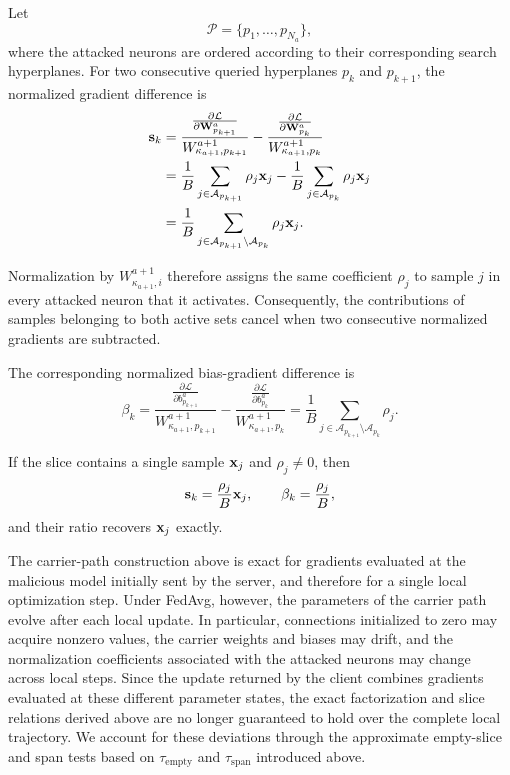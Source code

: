 Let
\[
    \mathcal P=\{p_1,\ldots,p_{N_a}\},
\]
where the attacked neurons are ordered according to their corresponding
search hyperplanes. For two consecutive queried hyperplanes $p_k$ and
$p_{k+1}$, the normalized gradient difference is
\begin{equation}\label{eq:stealth_slice}
\begin{aligned}
\mathbf{s}_k
&=
\frac{
    \frac{\partial\mathcal L}
         {\partial\mathbf{W}_{p_{k+1}}^a}
}{
    W^{a+1}_{\kappa_{a+1},p_{k+1}}
}
-
\frac{
    \frac{\partial\mathcal L}
         {\partial\mathbf{W}_{p_k}^a}
}{
    W^{a+1}_{\kappa_{a+1},p_k}
} \\
&=
\frac{1}{B}
\sum_{j\in\mathcal A_{p_{k+1}}}
\rho_j{\mathbf{x}}_j
-
\frac{1}{B}
\sum_{j\in\mathcal A_{p_k}}
\rho_j{\mathbf{x}}_j \\
&=
\frac{1}{B}
\sum_{j\in
\mathcal A_{p_{k+1}}\setminus\mathcal A_{p_k}}
\rho_j{\mathbf{x}}_j .
\end{aligned}
\end{equation}

Normalization by $W^{a+1}_{\kappa_{a+1},i}$ therefore assigns the same
coefficient $\rho_j$ to sample $j$ in every attacked neuron that it
activates. Consequently, the contributions of samples belonging to both
active sets cancel when two consecutive normalized gradients are
subtracted.

The corresponding normalized bias-gradient difference is
\begin{equation}
\beta_k
=
\frac{
    \frac{\partial\mathcal L}
         {\partial b_{p_{k+1}}^a}
}{
    W^{a+1}_{\kappa_{a+1},p_{k+1}}
}
-
\frac{
    \frac{\partial\mathcal L}
         {\partial b_{p_k}^a}
}{
    W^{a+1}_{\kappa_{a+1},p_k}
}
=
\frac{1}{B}
\sum_{j\in
\mathcal A_{p_{k+1}}\setminus\mathcal A_{p_k}}
\rho_j.
\end{equation}

If the slice contains a single sample ${\mathbf{x}}_j$ and $\rho_j\neq 0$, then
\[
    \mathbf{s}_k = \frac{\rho_j}{B}{\mathbf{x}}_j,
    \qquad
    \beta_k = \frac{\rho_j}{B},
\]
and their ratio recovers ${\mathbf{x}}_j$ exactly.

The carrier-path construction above is exact for gradients evaluated at
the malicious model initially sent by the server, and therefore for a
single local optimization step. Under FedAvg, however, the parameters of
the carrier path evolve after each local update. In particular, connections
initialized to zero may acquire nonzero values, the carrier weights and
biases may drift, and the normalization coefficients associated with the
attacked neurons may change across local steps. Since the update returned
by the client combines gradients evaluated at these different parameter
states, the exact factorization and slice relations derived above are no
longer guaranteed to hold over the complete local trajectory. We account
for these deviations through the approximate empty-slice and span tests
based on $\tau_{\mathrm{empty}}$ and $\tau_{\mathrm{span}}$ introduced
above.

